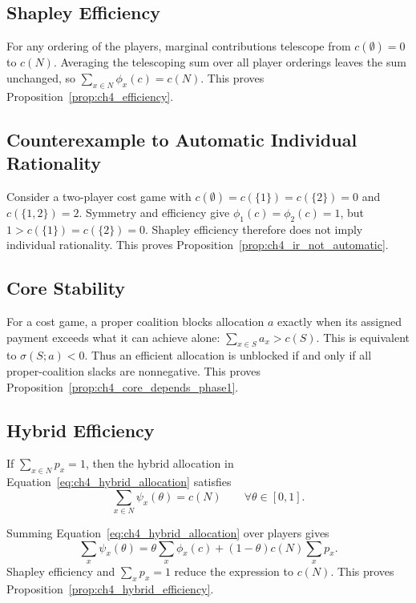 \subsection{Shapley Efficiency}

For any ordering of the players, marginal contributions telescope from
$c(\emptyset)=0$ to $c(N)$. Averaging the telescoping sum over all player
orderings leaves the sum unchanged, so
$\sum_{x\in N}\phi_x(c)=c(N)$. This proves
Proposition~\ref{prop:ch4_efficiency}.

\subsection{Counterexample to Automatic Individual Rationality}

Consider a two-player cost game with
$c(\emptyset)=c(\{1\})=c(\{2\})=0$ and $c(\{1,2\})=2$. Symmetry and efficiency
give $\phi_1(c)=\phi_2(c)=1$, but $1>c(\{1\})=c(\{2\})=0$. Shapley efficiency
therefore does not imply individual rationality. This proves
Proposition~\ref{prop:ch4_ir_not_automatic}.

\subsection{Core Stability}

For a cost game, a proper coalition blocks allocation $a$ exactly when its
assigned payment exceeds what it can achieve alone:
$\sum_{x\in S}a_x>c(S)$. This is equivalent to
$\sigma(S;a)<0$. Thus an efficient allocation is unblocked if and only if all
proper-coalition slacks are nonnegative. This proves
Proposition~\ref{prop:ch4_core_depends_phase1}.

\subsection{Hybrid Efficiency}

\begin{proposition}
\label{prop:ch4_hybrid_efficiency}
If $\sum_{x\in N}p_x=1$, then the hybrid allocation in
Equation~\eqref{eq:ch4_hybrid_allocation} satisfies
\begin{equation}
\label{eq:ch4_hybrid_efficiency}
\sum_{x\in N}\psi_x(\theta)=c(N)
\qquad \forall \theta\in[0,1].
\end{equation}
\end{proposition}

Summing Equation~\eqref{eq:ch4_hybrid_allocation} over players gives
\[
\sum_x\psi_x(\theta)
=\theta\sum_x\phi_x(c)+(1-\theta)c(N)\sum_xp_x.
\]
Shapley efficiency and $\sum_xp_x=1$ reduce the expression to $c(N)$. This
proves Proposition~\ref{prop:ch4_hybrid_efficiency}.

